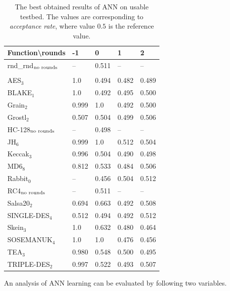 \documentclass[
  print, %
  Table,   %
  nolof,     %
  nolot,     %
  11pt, %
  oneside  %
]{fithesis3}
\newcommand{\fd}{\cellcolor{red!13}}
\newcommand{\fn}{\cellcolor{green!13}}
\begin{document}
\begin{table}[H]
\centering
\begin{tabular}{l|l l l l}
Function\textbackslash{}rounds & -1 & 0 & 1 & 2\\ \hline
rnd\_rnd$_{\textnormal{no rounds}}$& -- & \fn{}0.511 & --         & --         \\\\
AES$_{3}$        & \fd{}1.0   & \fn{}0.494 & \fn{}0.482 & \fn{}0.489 \\
BLAKE$_{1}$      & \fd{}1.0   & \fn{}0.492 & \fn{}0.495 & \fn{}0.500 \\
Grain$_{2}$      & \fd{}0.999 & \fd{}1.0   & \fn{}0.492 & \fn{}0.500 \\
Grostl$_{2}$     & \fn{}0.507 & \fn{}0.504 & \fn{}0.499 & \fn{}0.506 \\
HC-128$_{\textnormal{no rounds}}$& --    & \fn{}0.498 & -- & --      \\
JH$_{6}$         & \fd{}0.999 & \fd{}1.0   & \fn{}0.512 & \fn{}0.504 \\
Keccak$_{3}$     & \fd{}0.996 & \fn{}0.504 & \fn{}0.490 & \fn{}0.498 \\
MD6$_{8}$        & \fd{}0.812 & \fd{}0.533 & \fn{}0.484 & \fn{}0.506 \\
Rabbit$_{0}$     &      --    & \fn{}0.456 & \fn{}0.504 & \fn{}0.512 \\
RC4$_{\textnormal{no rounds}}$& --         & \fn{}0.511 & --         & --         \\
Salsa20$_{2}$    & \fd{}0.694 & \fd{}0.663 & \fn{}0.492 & \fn{}0.508 \\
SINGLE-DES$_{4}$ & \fd{}0.512 & \fn{}0.494 & \fn{}0.492 & \fn{}0.512 \\
Skein$_{3}$      & \fd{}1.0   & \fd{}0.632 & \fn{}0.480 & \fn{}0.464 \\
SOSEMANUK$_{4}$  & \fd{}1.0   & \fn{}1.0   & \fn{}0.476 & \fn{}0.456 \\
TEA$_{3}$        & \fd{}0.980 & \fd{}0.548 & \fn{}0.500 & \fn{}0.495 \\
TRIPLE-DES$_{2}$ & \fd{}0.997 & \fd{}0.522 & \fn{}0.493 & \fn{}0.507
\end{tabular}
\caption{The best obtained results of ANN on usable testbed. The values are corresponding to \textit{acceptance rate}, where value $0.5$ is the reference value.}
\label{table:res-usable-ann}
\end{table}

An analysis of ANN learning can be evaluated by following two variables.
\end{document}
